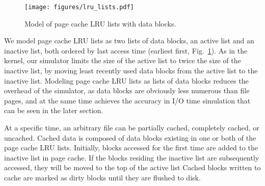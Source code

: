 \documentclass[conference]{IEEEtran}
\begin{document}
            \begin{figure}
                   \centering
                   \texttt{[image: figures/lru\_lists.pdf]}
                   \caption{Model of page cache LRU lists with data blocks.}    \label{fig:lrulist}
            \end{figure}    
            
            We model page cache LRU lists as 
            two lists of data blocks, an active list and an inactive list, both ordered by 
            last access time (earliest first, Fig.~\ref{fig:lrulist}).
            As in the kernel, our simulator limits the size of the active list to
            twice the size of the inactive list, by moving least recently 
            used data blocks from the active list to the inactive list.
            Modeling page cache LRU lists as lists of data blocks reduces the
            overhead of the simulator, as data blocks are obviously less
            numerous than file pages, and at the same time achieves the accuracy in 
            I/O time simulation that can be seen in the later section.
            
            At a specific time, an arbitrary file can be partially cached, completely cached, 
            or uncached.
            Cached data is composed of data blocks existing in one or both
            of the page cache LRU lists. 
            Initially, blocks accessed for the first time are added to the inactive list in 
            page cache. 
            If the blocks residing the inactive list are subsequently accessed, 
            they will be moved to the top of the active list
            Cached blocks written to cache are marked as dirty blocks until 
            they are flushed to disk.
\end{document}
